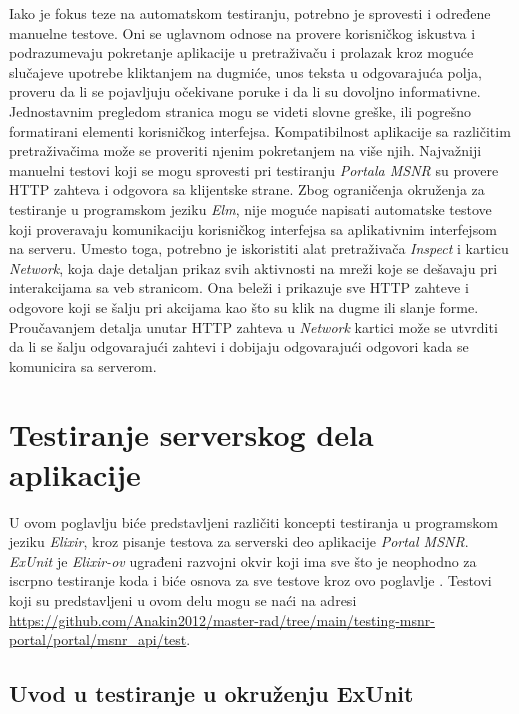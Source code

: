\documentclass[12pt,oneside]{memoir}
\begin{document}
\par Iako je fokus teze na automatskom testiranju, potrebno je sprovesti i određene manuelne testove. Oni se uglavnom odnose na provere korisničkog iskustva i podrazumevaju pokretanje aplikacije u pretraživaču i prolazak kroz moguće slučajeve upotrebe kliktanjem na dugmiće, unos teksta u odgovarajuća polja, proveru da li se pojavljuju očekivane poruke i da li su dovoljno informativne. Jednostavnim pregledom stranica mogu se videti slovne greške, ili pogrešno formatirani elementi korisničkog interfejsa. Kompatibilnost aplikacije sa različitim pretraživačima može se proveriti njenim pokretanjem na više njih. Najvažniji manuelni testovi koji se mogu sprovesti pri testiranju \emph{Portala MSNR} su provere HTTP zahteva i odgovora sa klijentske strane. Zbog ograničenja okruženja za testiranje u programskom jeziku \emph{Elm}, nije moguće napisati automatske testove koji proveravaju komunikaciju korisničkog interfejsa sa aplikativnim interfejsom na serveru. Umesto toga, potrebno je iskoristiti alat pretraživača \emph{Inspect} i karticu \emph{Network}, koja daje detaljan prikaz svih aktivnosti na mreži koje se dešavaju pri interakcijama sa veb stranicom. Ona beleži i prikazuje sve HTTP zahteve i odgovore koji se šalju pri akcijama kao što su klik na dugme ili slanje forme. Proučavanjem detalja unutar HTTP zahteva u \emph{Network} kartici može se utvrditi da li se šalju odgovarajući zahtevi i dobijaju odgovarajući odgovori kada se komunicira sa serverom.

\chapter{Testiranje serverskog dela aplikacije}
\label{chp:elixir}

\par U ovom poglavlju biće predstavljeni različiti koncepti testiranja u programskom jeziku \emph{Elixir}, kroz pisanje testova za serverski deo aplikacije \emph{Portal MSNR}. \textit{ExUnit} je \emph{Elixir-ov} ugrađeni razvojni okvir koji ima sve što je neophodno za iscrpno testiranje koda i biće osnova za sve testove kroz ovo poglavlje \cite{exunit}. Testovi koji su predstavljeni u ovom delu mogu se naći na adresi \url{https://github.com/Anakin2012/master-rad/tree/main/testing-msnr-portal/portal/msnr_api/test}.

\section{Uvod u testiranje u okruženju ExUnit}
\label{sec:elixunit}
\end{document}
